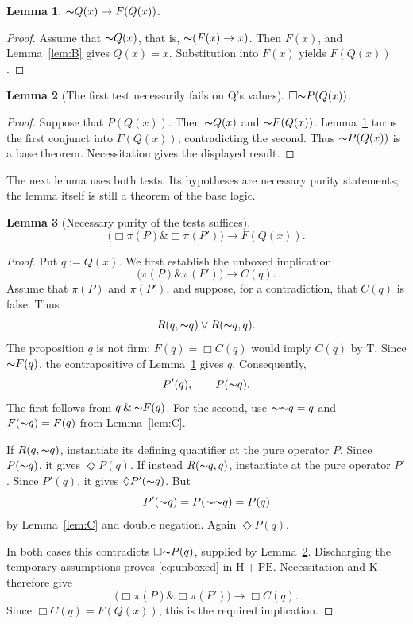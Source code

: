 \documentclass[12pt,leqno]{article}
\newcommand{\AND}{\ensuremath{\mathbin{\&}}}
\newcommand{\OR}{\ensuremath{\vee}}
\newcommand{\IC}{\ensuremath{\rightarrow}}
\newcommand{\NOT}{\ensuremath{\text{$\thicksim$}}}
\newcommand{\HPE}{\ensuremath{\mathrm{H}+\mathrm{PE}}}
\theoremstyle{plain}
\newtheorem{lemma}{Lemma}
\begin{document}
\begin{lemma}\label{lem:D}
\(\NOT Q(x)\IC F(Q(x))\).
\end{lemma}
\begin{proof}
Assume that \(\NOT Q(x)\), that is, \(\NOT(F(x)\IC x)\).
Then \(F(x)\), and Lemma~\ref{lem:B} gives \(Q(x)=x\).
Substitution into \(F(x)\) yields \(F(Q(x))\).
\end{proof}

\begin{lemma}[The first test necessarily fails on Q's values]\label{lem:E}
\(\Box\NOT P(Q(x))\).
\end{lemma}
\begin{proof}
Suppose that \(P(Q(x))\). Then \(\NOT Q(x)\) and \(\NOT F(Q(x))\).
Lemma~\ref{lem:D} turns the first conjunct into \(F(Q(x))\), contradicting
the second. Thus \(\NOT P(Q(x))\) is a base theorem.
Necessitation gives the displayed result.
\end{proof}

The next lemma uses both tests. Its hypotheses are necessary purity
statements; the lemma itself is still a theorem of the base logic.

\begin{lemma}[Necessary purity of the tests suffices]\label{lem:F}
\[
 \bigl(\Box\pi(P)\AND\Box\pi(P')\bigr)\IC F(Q(x)).
\]
\end{lemma}
\begin{proof}
Put \(q:=Q(x)\). We first establish the unboxed implication
\begin{equation}
 \bigl(\pi(P)\AND\pi(P')\bigr)\IC C(q).
 \label{eq:unboxed}
\end{equation}
Assume that \(\pi(P)\) and \(\pi(P')\), and suppose, for a contradiction,
that \(C(q)\) is false. Thus
\[
 R(q,\NOT q)\OR R(\NOT q,q).
\]
The proposition \(q\) is not firm: \(F(q)=\Box C(q)\) would imply \(C(q)\)
by T. Since \(\NOT F(q)\), the contrapositive of Lemma~\ref{lem:D}
gives \(q\). Consequently,
\[
 P'(q),\qquad P(\NOT q).
\]
The first follows from \(q\AND\NOT F(q)\).
For the second, use \(\NOT\NOT q=q\) and
\(F(\NOT q)=F(q)\) from Lemma~\ref{lem:C}.

If \(R(q,\NOT q)\), instantiate its defining quantifier at the pure
operator \(P\). Since \(P(\NOT q)\), it gives \(\Diamond P(q)\).
If instead \(R(\NOT q,q)\), instantiate at the pure operator \(P'\).
Since \(P'(q)\), it gives \(\Diamond P'(\NOT q)\). But
\[
 P'(\NOT q)=P(\NOT\NOT q)=P(q)
\]
by Lemma~\ref{lem:C} and double negation. Again \(\Diamond P(q)\).

In both cases this contradicts \(\Box\NOT P(q)\), supplied by
Lemma~\ref{lem:E}. Discharging the temporary assumptions proves
\eqref{eq:unboxed} in \HPE. Necessitation and K therefore give
\[
 \bigl(\Box\pi(P)\AND\Box\pi(P')\bigr)\IC\Box C(q).
\]
Since \(\Box C(q)=F(Q(x))\), this is the required implication.
\end{proof}
\end{document}
